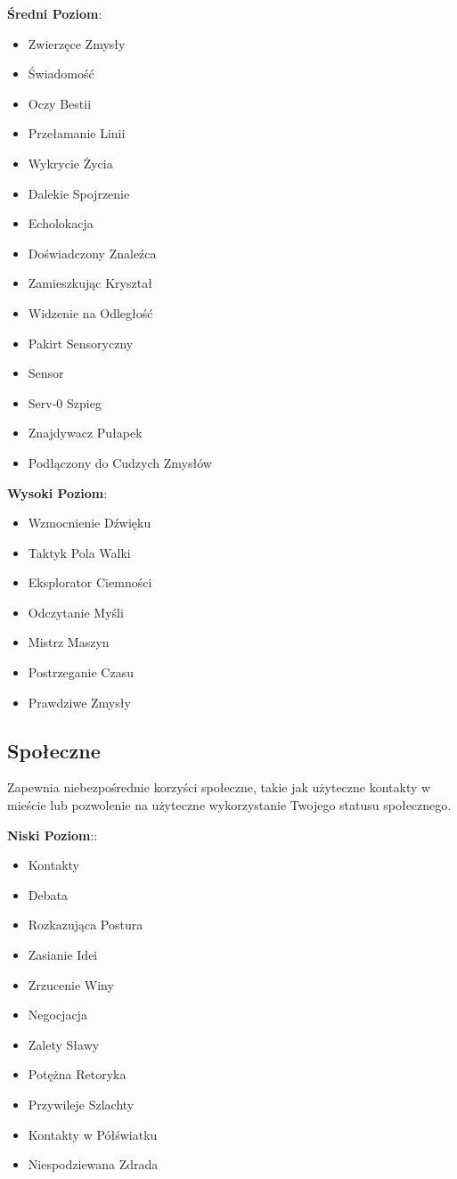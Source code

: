\textbf{Średni Poziom}:

\begin{itemize}
\item Zwierzęce Zmysły
\item Świadomość
\item Oczy Bestii
\item Przełamanie Linii
\item Wykrycie Życia
\item Dalekie Spojrzenie
\item Echolokacja
\item Doświadczony Znaleźca
\item Zamieszkując Kryształ
\item Widzenie na Odległość
\item Pakirt Sensoryczny
\item Sensor
\item Serv-0 Szpieg
\item Znajdywacz Pułapek
\item Podłączony do Cudzych Zmysłów
\end{itemize}

\textbf{Wysoki Poziom}:

\begin{itemize}
\item Wzmocnienie Dźwięku
\item Taktyk Pola Walki
\item Eksplorator Ciemności
\item Odczytanie Myśli
\item Mistrz Maszyn
\item Postrzeganie Czasu
\item Prawdziwe Zmysły
\end{itemize}

\subsection{Społeczne}

Zapewnia niebezpośrednie korzyści społeczne, takie jak użyteczne kontakty w mieście lub pozwolenie na użyteczne wykorzystanie Twojego statusu społecznego.

\textbf{Niski Poziom}::

\begin{itemize}
\item Kontakty
\item Debata
\item Rozkazująca Postura
\item Zasianie Idei
\item Zrzucenie Winy
\item Negocjacja
\item Zalety Sławy
\item Potężna Retoryka
\item Przywileje Szlachty
\item Kontakty w Półświatku
\item Niespodziewana Zdrada
\end{itemize}

